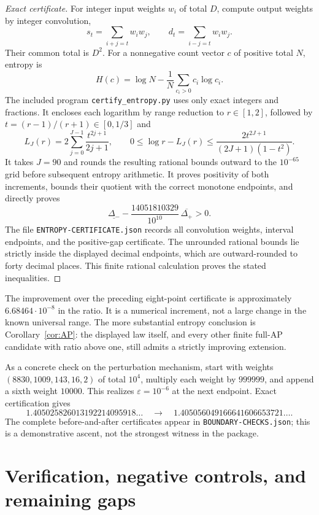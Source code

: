 \documentclass[11pt]{article}
\theoremstyle{remark}
\newcommand{\Dplus}{\Delta_+}
\newcommand{\Dminus}{\Delta_-}
\begin{document}
\begin{proof}[Exact certificate]
For integer input weights $w_i$ of total $D$, compute output weights by
integer convolution,
\[
 s_t=\sum_{i+j=t}w_iw_j,\qquad d_t=\sum_{i-j=t}w_iw_j.
\]
Their common total is $D^2$. For a nonnegative count vector $c$ of positive
total $N$, entropy is
\[
 H(c)=\log N-\frac1N\sum_{c_i>0}c_i\log c_i.
\]
The included program \texttt{certify\_entropy.py} uses only exact integers
and fractions. It encloses each logarithm by range reduction to $r\in[1,2]$,
followed by $t=(r-1)/(r+1)\in[0,1/3]$ and
\[
 L_J(r)=2\sum_{j=0}^{J-1}\frac{t^{2j+1}}{2j+1},\qquad
 0\leq\log r-L_J(r)\leq
 \frac{2t^{2J+1}}{(2J+1)(1-t^2)}.
\]
It takes $J=90$ and rounds the resulting rational bounds outward to the
$10^{-65}$ grid before subsequent entropy arithmetic. It proves positivity
of both increments, bounds their quotient with the correct monotone
endpoints, and directly proves
\[
 \underline{\Dminus}
 -\frac{14051810329}{10^{10}}\,\overline{\Dplus}>0.
\]
The file \texttt{ENTROPY-CERTIFICATE.json} records all convolution weights,
interval endpoints, and the positive-gap certificate. The unrounded
rational bounds lie strictly inside the displayed decimal endpoints,
which are outward-rounded to forty decimal places. This finite rational
calculation proves the stated inequalities.
\end{proof}

The improvement over the preceding eight-point certificate is approximately
$6.68464\cdot10^{-8}$ in the ratio. It is a numerical increment, not a
large change in the known universal range. The more substantial entropy
conclusion is Corollary~\ref{cor:AP}: the displayed law itself, and every
other finite full-AP candidate with ratio above one, still admits a
strictly improving extension.

As a concrete check on the perturbation mechanism, start with weights
$(8830,1009,143,16,2)$ of total $10^4$, multiply each weight by $999999$,
and append a sixth weight $10000$. This realizes
$\varepsilon=10^{-6}$ at the next endpoint. Exact certification gives
\[
 1.405025826013192214095918\ldots
 \quad\longrightarrow\quad
 1.405056049166641606653721\ldots.
\]
The complete before-and-after certificates appear in
\texttt{BOUNDARY-CHECKS.json}; this is a demonstrative ascent, not the
strongest witness in the package.

\section{Verification, negative controls, and remaining gaps}
\end{document}

